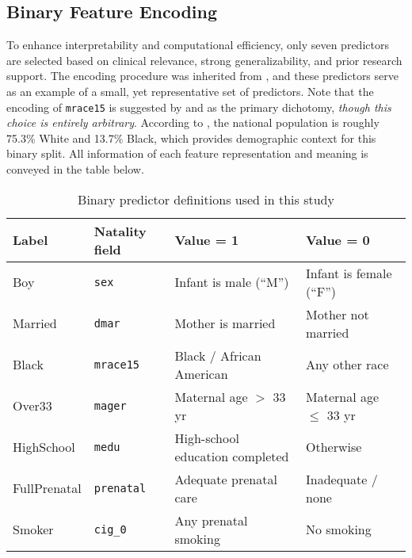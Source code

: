 \subsection{Binary Feature Encoding}
\label{sec:ch2-feature-encoding}

To enhance interpretability and computational efficiency, only seven predictors are selected based on clinical relevance, strong generalizability,  and prior research support. The encoding procedure was inherited from \textcite{jain2024}, and these predictors serve as an example of a small, yet representative set of predictors. Note that the encoding of \texttt{mrace15} is suggested by \textcite{jain2024} and \textcite{marchofdimes2024} as the primary dichotomy, \emph{though this choice is entirely arbitrary}.  According to \citeyear{census_usa} \textcite{census_usa}, the national population is roughly 75.3\% White and 13.7\% Black, which provides demographic context for this binary split. All information of each feature representation and meaning is conveyed in the table below.

\begin{table}[ht]
\centering         %
\small             %
\caption{Binary predictor definitions used in this study}
\begin{tabular}{@{}llll@{}}
\toprule
\textbf{Label} & \textbf{Natality field} & \textbf{Value = 1} & \textbf{Value = 0} \\ \midrule
Boy          & \texttt{sex}      & Infant is male (“M”)                     & Infant is female (“F”) \\
Married      & \texttt{dmar}     & Mother is married                        & Mother not married     \\
Black        & \texttt{mrace15}  & Black / African American                 & Any other race         \\
Over33       & \texttt{mager}    & Maternal age $>$ 33 yr                   & Maternal age $\le$ 33 yr \\
HighSchool   & \texttt{medu}     & High-school education completed          & Otherwise              \\
FullPrenatal & \texttt{prenatal} & Adequate prenatal care                   & Inadequate / none      \\
Smoker       & \texttt{cig\_0}   & Any prenatal smoking                     & No smoking             \\ \bottomrule
\end{tabular}
\end{table}



